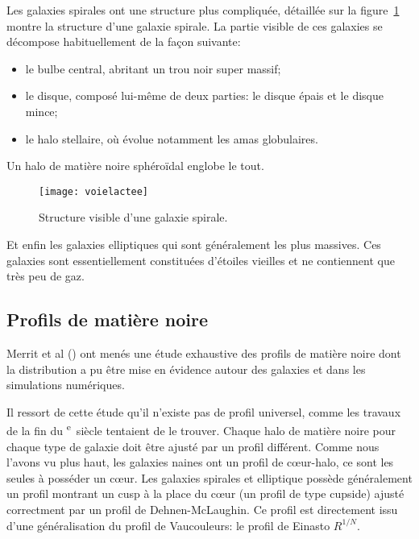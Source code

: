 			Les galaxies spirales ont une structure plus compliquée, détaillée sur la
			figure~\ref{Fig::Intro::schemaGS} montre la structure d'une galaxie spirale.
			La partie visible de ces galaxies se décompose  habituellement de la façon suivante:
			\begin{itemize}
				\item le bulbe central, abritant un trou noir super massif;
				\item le disque, composé lui-même de deux parties: le disque épais
					et le disque mince;
				\item le halo stellaire, où évolue notamment les amas globulaires.
			\end{itemize}
			Un halo de matière noire sphéroïdal englobe le tout.

			\begin{figure}[h]
				\begin{center}
					\texttt{[image: voielactee]}
				\end{center}
				\caption{Structure visible d'une galaxie spirale.\label{Fig::Intro::schemaGS}}
			\end{figure}

			Et enfin les galaxies elliptiques qui sont généralement les
			plus massives. Ces galaxies sont essentiellement
			constituées d'étoiles vieilles et ne contiennent que très
			peu de gaz.

		\subsection{Profils de matière noire}

			Merrit et al
			(\cite{2006AJ....132.2685M,2006AJ....132.2701G,2006AJ....132.2711G})
			ont menés une étude exhaustive des profils de matière
			noire dont la distribution a pu être mise en évidence
			autour des galaxies et dans les simulations numériques.

			Il ressort de cette étude qu'il n'existe pas de profil
			universel, comme les travaux de la fin du  \textsuperscript{e}~siècle tentaient de
			le trouver. Chaque halo de matière noire pour chaque type
			de galaxie doit être ajusté par un profil différent.
			Comme nous l'avons vu plus haut, les galaxies naines
			ont un profil de cœur-halo, ce sont les seules à
			posséder un cœur. Les galaxies spirales et elliptique
			possède généralement un profil montrant un cusp à la
			place du cœur (un profil de type cupside) ajusté
			correctment par un profil de Dehnen-McLaughin. Ce profil
			est directement issu d'une généralisation du profil de
			Vaucouleurs: le profil de Einasto $R^{1/N}$.

